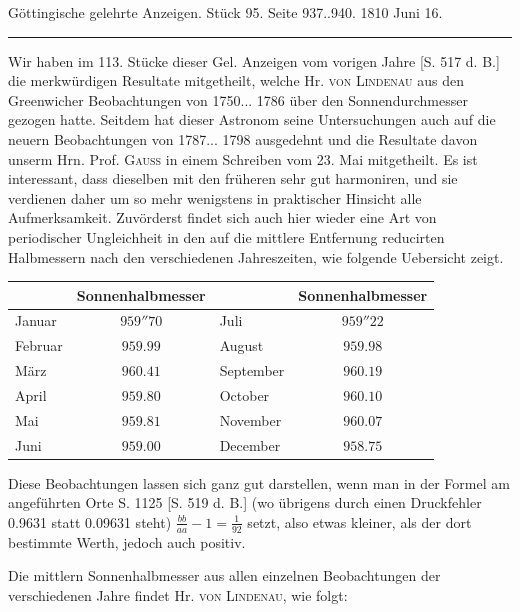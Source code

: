 \clearpage
{}
\hypertarget{native-530-lower}{}\label{native-530-lower}
\begin{center}\small Göttingische gelehrte Anzeigen. Stück 95. Seite 937..940. 1810 Juni 16.\\[3pt]\rule{.72\linewidth}{.3pt}\end{center}

Wir haben im 113. Stücke dieser Gel. Anzeigen vom vorigen Jahre [S. 517 d. B.] die merkwürdigen Resultate mitgetheilt, welche Hr. \textsc{von Lindenau} aus den Greenwicher Beobachtungen von 1750... 1786 über den Sonnendurchmesser gezogen hatte. Seitdem hat dieser Astronom seine Untersuchungen auch auf die neuern Beobachtungen von 1787... 1798 ausgedehnt und die Resultate davon unserm Hrn. Prof. \textsc{Gauss} in einem Schreiben vom 23. Mai mitgetheilt. Es ist interessant, dass dieselben mit den früheren sehr gut harmoniren, und sie verdienen daher um so mehr wenigstens in praktischer Hinsicht alle Aufmerksamkeit. Zuvörderst findet sich auch hier wieder eine Art von periodischer Ungleichheit in den auf die mittlere Entfernung reducirten Halbmessern nach den verschiedenen Jahreszeiten, wie folgende Uebersicht zeigt.

\begin{center} \begin{tabular}{l|c||l|c} & Sonnenhalbmesser & & Sonnenhalbmesser \\ \hline Januar & $959''70$ & Juli & $959''22$ \\ Februar & $959.99$ & August & $959.98$ \\ März & $960.41$ & September & $960.19$ \\ April & $959.80$ & October & $960.10$ \\ Mai & $959.81$ & November & $960.07$ \\ Juni & $959.00$ & December & $958.75$ \\ \end{tabular} \end{center}

Diese Beobachtungen lassen sich ganz gut darstellen, wenn man in der Formel am angeführten Orte S. 1125 [S. 519 d. B.] (wo übrigens durch einen Druckfehler 0.9631 statt 0.09631 steht) $\frac{bb}{aa} - 1 = \frac{1}{92}$ setzt, also etwas kleiner, als der dort bestimmte Werth, jedoch auch positiv.

Die mittlern Sonnenhalbmesser aus allen einzelnen Beobachtungen der verschiedenen Jahre findet Hr. \textsc{von Lindenau}, wie folgt:

